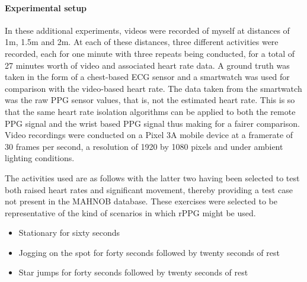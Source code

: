 
\paragraph{Experimental setup}
In these additional experiments, videos were recorded of myself at distances of 1m, 1.5m and 2m. 
At each of these distances, three different activities were recorded, each for one minute with three repeats being conducted, for a total of 27 minutes worth of video and associated heart rate data.
A ground truth was taken in the form of a chest-based ECG sensor and a smartwatch was used for comparison with the video-based heart rate.
The data taken from the smartwatch was the raw PPG sensor values, that is, not the estimated heart rate. This is so that the same heart rate isolation algorithms can be applied to both the 
remote PPG signal and the wrist based PPG signal thus making for a fairer comparison.
Video recordings were conducted on a Pixel 3A mobile device at a framerate of 30 frames per second, a resolution of 1920 by 1080 pixels and under ambient lighting conditions.

The activities used are as follows with the latter two having been selected to test both raised heart rates and significant movement, thereby providing a test case not present in the MAHNOB database.
These exercises were selected to be representative of the kind of scenarios in which rPPG might be used.
\begin{itemize}
   \item Stationary for sixty seconds
   \item Jogging on the spot for forty seconds followed by twenty seconds of rest
   \item Star jumps for forty seconds followed by twenty seconds of rest
\end{itemize}


